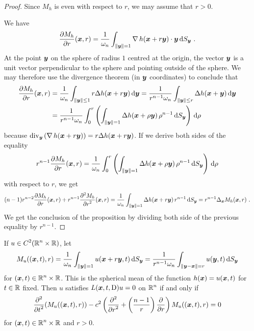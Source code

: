 \begin{proof}
Since $M_h$ is even with respect to $r$, we may assume that $r>0$.

We have
\[
\pdydx{M_h}{r}(\VEC{x},r)
= \frac{1}{\omega_n} \int_{\|\VEC{y}\|=1} \graD h(\VEC{x} + r \VEC{y})
\cdot \VEC{y} \dss{S}{y} \ .
\]
At the point $\VEC{y}$ on the sphere of radius $1$ centred at the
origin, the vector $\VEC{y}$ is a unit vector perpendicular to 
the sphere and pointing outside of the sphere.  We may therefore use
the divergence theorem (in $\VEC{y}$ coordinates) to conclude that
\begin{align*}
\pdydx{M_h}{r}(\VEC{x},r)
&= \frac{1}{\omega_n} \int_{\|\VEC{y}\|\leq 1} r \Delta h(\VEC{x} + r \VEC{y}) 
\dx{\VEC{y}}
= \frac{1}{r^{n-1} \omega_n} \int_{\|\VEC{y}\|\leq r} \Delta h(\VEC{x}+\VEC{y}) 
\dx{\VEC{y}} \\
&= \frac{1}{r^{n-1} \omega_n} \int_0^r \left( \int_{\|\VEC{y}\|= 1}
\Delta h(\VEC{x} + \rho \VEC{y}) \, \rho^{n-1} \dss{S}{y} \right) \dx{\rho}
\end{align*}
because
$\displaystyle \diV_{\VEC{y}} \left( \graD h(\VEC{x} + r \VEC{y}) \right)
= r \Delta h(\VEC{x} + r \VEC{y})$.
If we derive both sides of the equality
\[
r^{n-1} \pdydx{M_h}{r}(\VEC{x},r) =
\frac{1}{\omega_n} \int_0^r \left( \int_{\|\VEC{y}\|= 1}
\Delta h(\VEC{x} + \rho \VEC{y})\, \rho^{n-1} \dss{S}{y} \right) \dx{\rho}
\]
with respect to $r$, we get
\[
(n-1) r^{n-2} \pdydx{M_h}{r}(\VEC{x},r) 
+ r^{n-1} \pdydxn{M_h}{r}{2}(\VEC{x},r) 
= \frac{1}{\omega_n} \int_{\|\VEC{y}\|= 1}
\Delta h(\VEC{x} + r \VEC{y}) \, r^{n-1} \dss{S}{y}
= r^{n-1} \Delta_{\VEC{x}} M_h(\VEC{x},r) \ .
\]
We get the conclusion of the proposition by dividing both side of the
previous equality by $\displaystyle r^{n-1}$.
\end{proof}

\begin{cor} %
If $\displaystyle u \in C^2(\RR^n \times \RR)$, let  \label{wave_sol_oaCOR}
\[
M_u( (\VEC{x},t), r) =
\frac{1}{\omega_n} \int_{\|\VEC{y}\|=1} u(\VEC{x} + r \VEC{y},t) 
\dss{S}{y}
= \frac{1}{r^{n-1} \omega_n}
\int_{\|\VEC{y}-\VEC{x}\|=r} u(\VEC{y},t) \dss{S}{y}
\]
for $\displaystyle (\VEC{x},t) \in \RR^n \times \RR$.  This is the
spherical mean of the function $h(\VEC{x}) = u(\VEC{x},t)$ for
$t\in \RR$ fixed.  Then 
$u$ satisfies $\displaystyle L(\VEC{x},t,\diff)u=0$ on
$\displaystyle \RR^n$ if and only if
\begin{equation} \label{wave_sol_oa}
\pdfdxn{ \left(
M_u((\VEC{x},t),r)\right) }{t}{2} \\
- c^2 \left( \pdydxn{}{r}{2} + \left(\frac{n-1}{r}\right) \pdydx{}{r} \right)
M_u((\VEC{x},t),r) = 0
\end{equation}
for $\displaystyle (\VEC{x},t) \in \RR^n \times \RR$ and $r>0$.
\end{cor}

